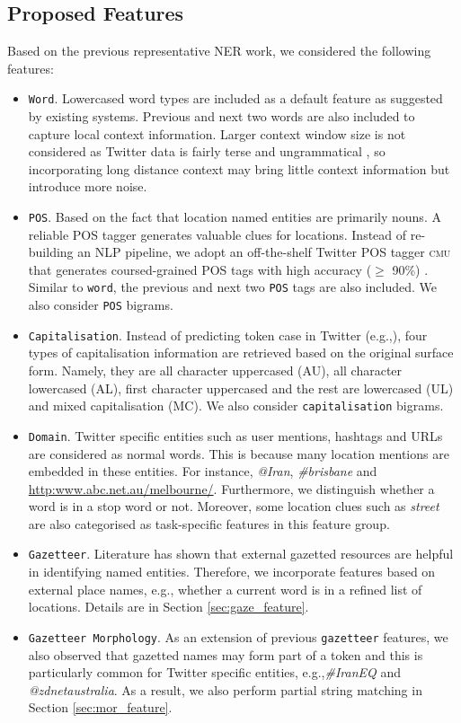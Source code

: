 \documentclass[11pt]{article}
\newcommand{\eg}{e.g.,\xspace}
\newcommand{\myex}[1]{\textit{#1}}
\newcommand{\cmu}{\textsc{cmu}\xspace}
\newcommand{\feature}[1]{\texttt{#1}\xspace}
\newcommand{\myurl}[1]{{\footnotesize\url{#1}}}
\newcommand{\secref}[2][]{Section#1 \ref{#2}}
\begin{document}
\subsection{Proposed Features}
\label{sec:basic_feature}

Based on the previous representative NER work, we considered the following features:

\begin{itemize}
    \item \feature{Word}. Lowercased word types are included as a default feature as suggested by existing systems. Previous and next two words are also included to capture local context information. Larger context window size is not considered as Twitter data is fairly terse and ungrammatical \cite{baldwin2013}, so incorporating long distance context may bring little context information but introduce more noise.
    \item \feature{POS}. Based on the fact that location named entities are primarily nouns. A reliable POS tagger generates valuable clues for locations. Instead of re-building an NLP pipeline, we adopt an off-the-shelf Twitter POS tagger \cmu that generates coursed-grained POS tags with high accuracy ($\ge$ 90\%) \cite{naacl13owop}. Similar to \feature{word}, the previous and next two \feature{POS} tags are also included. We also consider \feature{POS} bigrams.
    \item \feature{Capitalisation}. Instead of predicting token case in Twitter (\eg \cite{emnlp11ritt}), four types of capitalisation information are retrieved based on the original surface form. Namely, they are all character uppercased (AU), all character lowercased (AL), first character uppercased and the rest are lowercased (UL) and mixed capitalisation (MC). We also consider \feature{capitalisation} bigrams.
    \item \feature{Domain}. Twitter specific entities such as user mentions, hashtags and URLs are considered as normal words. This is because many location mentions are embedded in these entities. For instance, \myex{@Iran}, \myex{\#brisbane} and \myurl{http:www.abc.net.au/melbourne/}. Furthermore, we distinguish whether a word is in a stop word or not. Moreover, some location clues such as \myex{street} are also categorised as task-specific features in this feature group.
    \item \feature{Gazetteer}. Literature has shown that external gazetted resources are helpful in identifying named entities. Therefore, we incorporate features based on external place names, \eg whether a current word is in a refined list of locations. Details are in \secref{sec:gaze_feature}.
    \item \feature{Gazetteer Morphology}. As an extension of previous \feature{gazetteer} features, we also observed that gazetted names may form part of a token and this is particularly common for Twitter specific entities, \eg \myex{\#IranEQ} and \myex{@zdnetaustralia}. As a result, we also perform partial string matching in \secref{sec:mor_feature}. 
\end{itemize}
\end{document}
